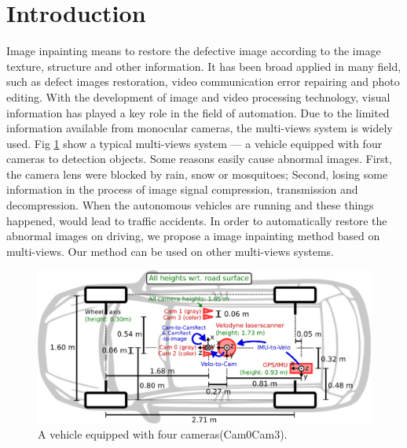 \documentclass{IEEE_lsens}
\begin{document}
\maketitle


\section{Introduction}

Image inpainting means to restore the defective image according to the image texture, structure and other information. It has been broad applied in many field, such as defect images restoration\cite{Efros1999::Texture,Lu2010::Novel}, video communication error repairing\cite{Rane2002::Wavelet,Rane2003:IToIP:Structure} and photo editing\cite{Bertalmio2000::Image,Shih2005::Digital}. With the development of image and video processing technology, visual information has played a key role in the field  of automation. Due to the limited information available from monocular cameras, the multi-views system is widely used. Fig \ref{fig:VehicleWithFourCameras} show a typical multi-views system --- a vehicle equipped with four cameras to detection objects\cite{Geiger2012::Are}. Some reasons easily cause abnormal images. First, the camera lens were blocked by rain, snow or mosquitoes; Second, losing some information in the process of image signal compression, transmission and decompression. When the autonomous vehicles are running and these things happened, would lead to traffic accidents. In order to automatically restore the abnormal images on driving, we propose a image inpainting method based on multi-views. Our method can be used on other multi-views systems.

\begin{figure}[!t]
\centering
\includegraphics[width=6.0in]{self_driver_top_view}
\caption{A vehicle equipped with four cameras(Cam0\texttildelow Cam3).}
\label{fig:VehicleWithFourCameras}
\end{figure}
\end{document}
